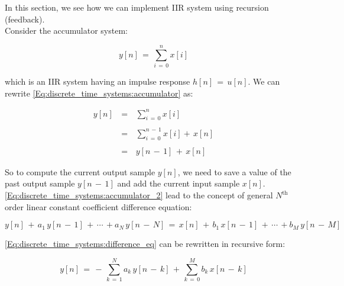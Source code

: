 In this section, we see how we can implement  IIR system using recursion (feedback).\\

Consider the accumulator system:

\begin{equation}
y[n] \, = \, \displaystyle\sum\limits_{i \, = \, 0}^n x[i]
\label{Eq:discrete_time_systems:accumulator}
\end{equation}

which is an IIR system having an impulse response $h[n] \, = \, u[n]$. We can rewrite \autoref{Eq:discrete_time_systems:accumulator} as:

\begin{equation}
\begin{array}{rcl}
y[n] \, &=& \, \displaystyle\sum\limits_{i \, = \, 0}^n x[i] \\ \\		
		&=& \, \displaystyle\sum\limits_{i \, = \, 0}^{n \, - \, 1} x[i] + \, x[n] \\ \\
		&=& \, y[n \, - \, 1] \, + \, x[n]
\end{array}
\label{Eq:discrete_time_systems:accumulator_2}
\end{equation}

So to compute the current output sample $y[n]$, we need to save a value of the past output sample $ y[n \, - \, 1] $ and add the current input sample $x[n]$.\\

\autoref{Eq:discrete_time_systems:accumulator_2} lead to the concept of general $N^{\text{th}}$ order linear constant coefficient difference equation:

\begin{equation}
y[n] \, + \, a_1 \, y[n \, - \, 1] \, + \, \cdots \, + a_N \, y[n \, - \, N] \, = \, x[n] \, + \, b_1 \, x[n \, - \, 1] \, + \, \cdots \, + b_M \, y[n \, - \, M]
\label{Eq:discrete_time_systems:difference_eq}	
\end{equation}

\autoref{Eq:discrete_time_systems:difference_eq} can be rewritten in recursive form:

\begin{equation}
y[n] \, = \, - \, \displaystyle\sum\limits_{k \, = \, 1}^N a_k \, y[n \, - \, k] \, + \, \displaystyle\sum\limits_{k \, = \, 0}^M b_k \, x[n \, - \, k]
\label{Eq:discrete_time_systems:difference_eq_recursive} 
\end{equation}

